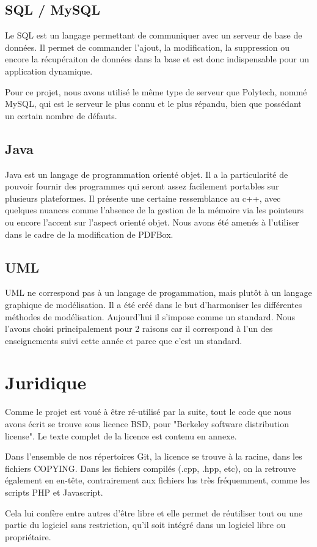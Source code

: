         \subsection{SQL / MySQL}
Le SQL est un langage permettant de communiquer avec un serveur de base de données. 
Il permet de commander l'ajout, la modification, la suppression ou encore la 
récupéraiton de données dans la base et est donc indispensable pour un application 
dynamique.

Pour ce projet, nous avons utilisé le même type de serveur que Polytech, nommé
MySQL, qui est le serveur le plus connu et le plus répandu, bien que possédant 
un certain nombre de défauts.


        \subsection{Java}
Java est un langage de programmation orienté objet. Il a la particularité de 
pouvoir fournir des programmes qui seront assez facilement portables sur plusieurs 
plateformes. Il présente une certaine ressemblance au c++, avec quelques nuances 
comme l'absence de la gestion de la mémoire via les pointeurs ou encore l'accent 
sur l'aspect orienté objet. Nous avons été amenés à l'utiliser dans le cadre de 
la modification de PDFBox. 


       \subsection{UML}
UML ne correspond pas à un langage de progammation, mais plutôt à un langage 
graphique de modélisation. Il a été créé dans le but d'harmoniser les
différentes méthodes de modélisation. Aujourd'hui il s'impose comme un standard. 
Nous l'avons choisi principalement pour 2 raisons car il correspond à l'un des 
enseignements suivi cette année et parce que c'est un standard.



    \section{Juridique}
Comme le projet est voué à être ré-utilisé par la suite, tout le code que nous 
avons écrit se trouve sous licence BSD, pour "Berkeley software distribution
license". Le texte complet de la licence est contenu en annexe.

Dans l'ensemble de nos répertoires Git, la licence se trouve à la racine, dans les
fichiers COPYING. Dans les fichiers compilés (.cpp, .hpp, etc), on la retrouve
également en en-tête, contrairement aux fichiers lus très fréquemment, comme les
scripts PHP et Javascript.

Cela lui confère entre autres d'être libre et elle permet de réutiliser tout ou 
une partie du logiciel sans restriction, qu'il soit intégré dans un logiciel libre 
ou propriétaire.

